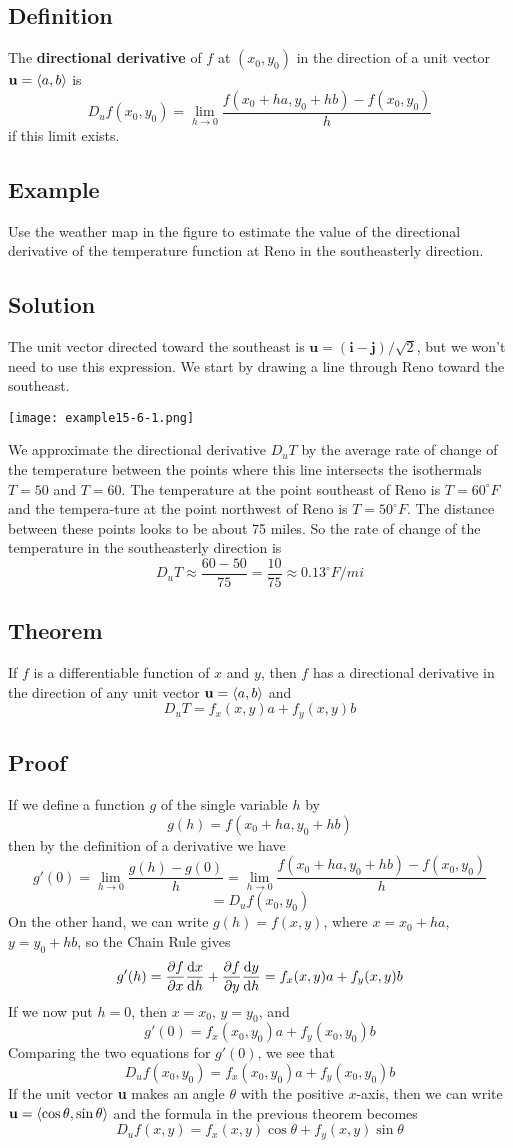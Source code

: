 \subsection*{Definition}
The \textbf{directional derivative} of $f$ at $(x_0,y_0)$ in the direction of
a unit vector $\textbf{u}=\ev{a,b}$ is
$$D_uf(x_0,y_0)=\lim_{h\to 0}\frac{f(x_0+ha,y_0+hb)-f(x_0,y_0)}{h}$$
if this limit exists.

\subsection*{Example}
Use the weather map in the figure to estimate the value of the directional derivative
of the temperature function at Reno in the southeasterly direction.

\subsection*{Solution}
The unit vector directed toward the southeast is $\mathbf{u=(i-j)}/\sqrt{2}$, but we
won't need to use this expression. We start by drawing a line through Reno toward
the southeast.
\begin{center}
    \texttt{[image: example15-6-1.png]}
\end{center}
We approximate the directional derivative $D_uT$ by the average rate of change of
the temperature between the points where this line intersects the isothermals
$T=50$ and $T=60$. The temperature at the point southeast of Reno is $T=60^\circ F$ and
the tempera-ture at the point northwest of Reno is $T=50^\circ F$. The distance between
these points looks to be about 75 miles. So the rate of change of the temperature
in the southeasterly direction is
$$D_uT\approx\frac{60-50}{75}=\frac{10}{75}\approx 0.13^\circ F/mi$$

\subsection*{Theorem}
If $f$ is a differentiable function of $x$ and $y$, then $f$ has a directional
derivative in the direction of any unit vector $\textbf{u}=\ev{a,b}$ and
$$D_uT=f_x(x,y)a+f_y(x,y)b$$

\subsection*{Proof}
If we define a function $g$ of the single variable $h$ by
$$g(h)=f(x_0+ha,y_0+hb)$$
then by the definition of a derivative we have
$$g'(0)=\lim_{h\to 0}\frac{g(h)-g(0)}{h}=\lim_{h\to 0}\frac{f(x_0+ha,y_0+hb)-f(x_0,y_0)}{h}$$
$$=D_uf(x_0,y_0)$$
On the other hand, we can write $g(h)=f(x,y)$, where $x=x_0+ha$, $y=y_0+hb$, so the
Chain Rule gives
$$g'(h)=\pdv{f}{x}\dv{x}{h}+\pdv{f}{y}\dv{y}{h}=f_x(x,y)a+f_y(x,y)b$$
If we now put $h=0$, then $x=x_0$, $y=y_0$, and
$$g'(0)=f_x(x_0,y_0)a+f_y(x_0,y_0)b$$
Comparing the two equations for $g'(0)$, we see that
$$D_uf(x_0,y_0)=f_x(x_0,y_0)a+f_y(x_0,y_0)b$$
If the unit vector \textbf{u} makes an angle $\theta$ with the positive $x$-axis, then
we can write $\textbf{u}=\ev{\cos{\theta},\sin{\theta}}$ and the formula in the previous theorem becomes
$$D_uf(x,y)=f_x(x,y)\cos{\theta}+f_y(x,y)\sin{\theta}$$

